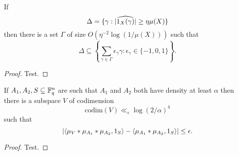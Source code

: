 \begin{theorem}\label{chang}
If 
\[\Delta = \{ \gamma : \lvert \widehat{1_{X}(\gamma)}\rvert \geq \eta \mu(X)\}\]
then there is a set $\Gamma$ of size $O(\eta^{-2}\log(1/\mu(X)))$ such that
\[\Delta\subseteq \left\{\sum_{\gamma\in\Gamma}\epsilon_\gamma\gamma : \epsilon_\gamma\in \{-1,0,1\}\right\}.\]
\end{theorem}
\begin{proof}
Test.
\end{proof}

\begin{theorem}\label{ap_in_ff}
If $A_1,A_2,S\subseteq \mathbb{F}_q^n$ are such that $A_1$ and $A_2$ both have density at least $\alpha$ then there is a subspace $V$ of codimension
\[\mathrm{codim}(V)\ll_\epsilon \log(2/\alpha)^4\]
such that
\[\left\lvert \langle \mu_V\ast \mu_{A_1}\ast \mu_{A_2},1_{S}\rangle-\langle \mu_{A_1}\ast \mu_{A_2},1_{S}\rangle\right\rvert\leq \epsilon.\]
\end{theorem}
\begin{proof}
Test.
\end{proof}